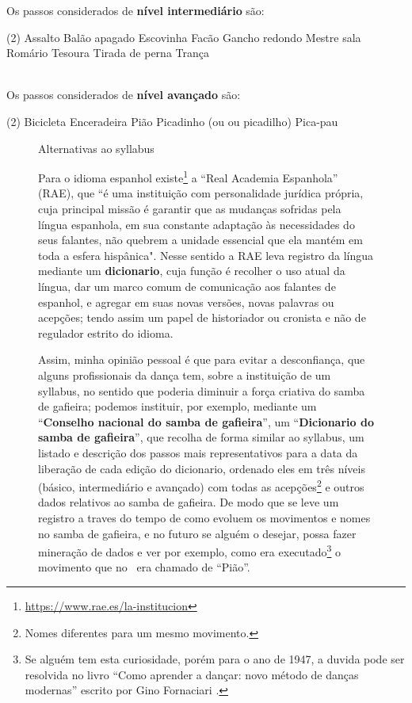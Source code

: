 Os passos considerados de \textbf{nível intermediário} são:
\begin{tasks}(2)
\task Assalto
\task Balão apagado
\task Escovinha
\task Facão
\task Gancho redondo
\task Mestre sala
\task Romário
\task Tesoura
\task Tirada de perna
\task Trança
\end{tasks}~\\

Os passos considerados de \textbf{nível avançado} são:
\begin{tasks}(2)
\task Bicicleta
\task Enceradeira
\task Pião
\task Picadinho (ou ou picadilho)
\task Pica-pau
\end{tasks}



\begin{figure}[t]
\begin{elaboracion}{Alternativas ao syllabus}

Para o idioma espanhol existe\footnote{\url{https://www.rae.es/la-institucion}} a ``Real Academia Espanhola'' (RAE),
que ``é uma instituição com personalidade jurídica própria, cuja principal missão é garantir 
que as mudanças sofridas pela língua espanhola, 
em sua constante adaptação às necessidades do seus falantes, 
não quebrem a unidade essencial que ela mantém em toda a esfera hispânica".
Nesse sentido a RAE leva registro da língua mediante um \textbf{dicionario},
cuja função é recolher o uso atual da língua, dar um marco comum de comunicação aos falantes de espanhol,
e agregar em suas novas versões, novas palavras ou acepções;
tendo assim um papel de historiador ou cronista e não de regulador estrito do idioma.

Assim, minha opinião pessoal é que para evitar a desconfiança, que alguns profissionais da dança tem,
sobre a instituição de um syllabus, no sentido  que poderia diminuir a força criativa do samba de gafieira;
podemos instituir, por exemplo, mediante um ``\textbf{Conselho nacional do samba de gafieira}'',
um ``\textbf{Dicionario do samba de gafieira}'', que recolha de forma similar ao syllabus,
um listado e descrição dos passos mais representativos para a data da liberação de cada edição do dicionario, 
ordenado eles em três níveis (básico, intermediário e avançado) 
com todas as acepções\footnote{Nomes diferentes para um mesmo movimento.}
e outros dados relativos ao samba de gafieira.
De modo que se leve um registro a traves do tempo de como evoluem os movimentos e nomes no samba de gafieira,
e no futuro se alguém o desejar, possa fazer mineração de dados e ver 
por exemplo, como era executado\footnote{Se alguém tem esta curiosidade,
porém para o ano de 1947, a duvida pode ser resolvida no livro
``Como aprender a dançar: novo método de danças modernas'' escrito por Gino Fornaciari \cite[pp. 72]{fornaciari1947aprender}.} 
o movimento que no \AnoLivro~era chamado de ``Pião''.
\end{elaboracion}
\label{fig:ImportanciaSyllabus}
\end{figure}


